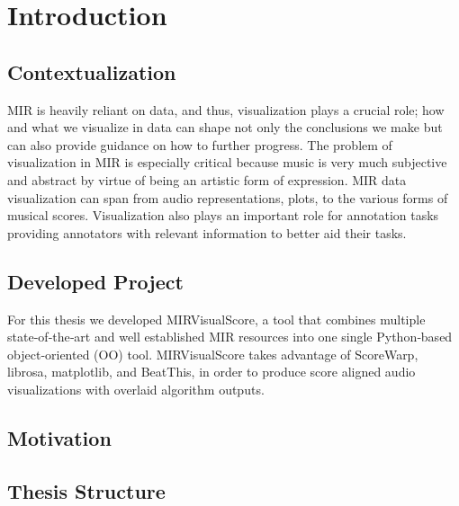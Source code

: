 \chapter{Introduction} \label{chap:intro}

\section*{}




\section{Contextualization} \label{sec:context}
MIR is heavily reliant on data, and thus, visualization plays a crucial role; how and what we visualize in data can shape not only the conclusions we make but can also provide guidance on how to further progress. The problem of visualization in MIR is especially critical because music is very much subjective and abstract by virtue of being an artistic form of expression. MIR data visualization can span from audio representations, plots, to the various forms of musical scores. Visualization also plays an important role for annotation tasks providing annotators with relevant information to better aid their tasks. 

\section{Developed Project} \label{sec:proj}
For this thesis we developed MIRVisualScore, a tool that combines multiple state‑of‑the‑art and well established MIR resources into one single Python‑based object‑oriented (OO) tool. MIRVisualScore takes advantage of ScoreWarp, librosa, matplotlib, and BeatThis, in order to produce score aligned audio visualizations with overlaid algorithm outputs. 

\section{Motivation} \label{sec:goals}


\section{Thesis Structure} \label{sec:struct}


